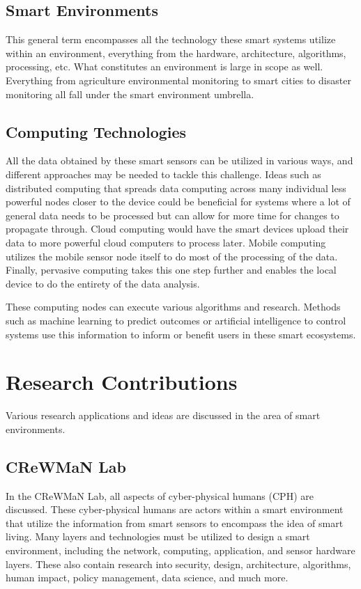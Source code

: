\documentclass[journal,onecolumn]{IEEEtran}
\begin{document}
\subsection{Smart Environments}

This general term encompasses all the technology these smart systems utilize within an environment, everything from the hardware, architecture, algorithms, processing, etc.
What constitutes an environment is large in scope as well. Everything from agriculture environmental monitoring to smart cities to disaster monitoring all fall under the smart environment umbrella. 

\subsection{Computing Technologies}

All the data obtained by these smart sensors can be utilized in various ways, and different approaches may be needed to tackle this challenge. 
Ideas such as distributed computing that spreads data computing across many individual less powerful nodes closer to the device could be beneficial for systems where a lot of general data needs to be processed but can allow for more time for changes to propagate through. 
Cloud computing would have the smart devices upload their data to more powerful cloud computers to process later. 
Mobile computing utilizes the mobile sensor node itself to do most of the processing of the data. 
Finally, pervasive computing takes this one step further and enables the local device to do the entirety of the data analysis. 

These computing nodes can execute various algorithms and research. Methods such as machine learning to predict outcomes or artificial intelligence to control systems use this information to inform or benefit users in these smart ecosystems. 

\section{Research Contributions}

Various research applications and ideas are discussed in the area of smart environments. 

\subsection{CReWMaN Lab}

In the CReWMaN Lab, all aspects of cyber-physical humans (CPH) are discussed. 
These cyber-physical humans are actors within a smart environment that utilize the information from smart sensors to encompass the idea of smart living. 
Many layers and technologies must be utilized to design a smart environment, including the network, computing, application, and sensor hardware layers. 
These also contain research into security, design, architecture, algorithms, human impact, policy management, data science, and much more. 
\end{document}
